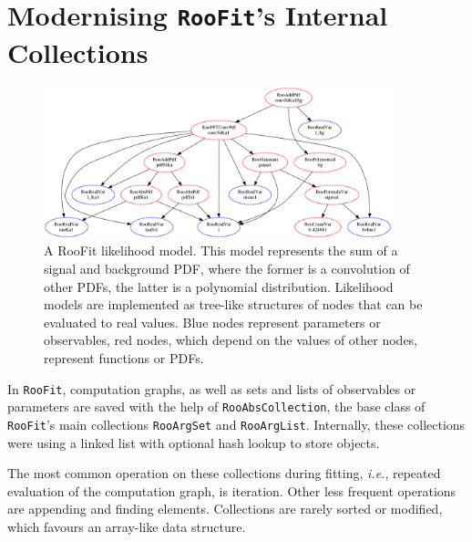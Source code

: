\documentclass[a4paper]{jpconf}
\newcommand{\RooFit}{\texttt{RooFit}\xspace}
\newcommand{\ie}{\textit{i.e.}\xspace}
\begin{document}
\section{Modernising \RooFit's Internal Collections\label{sec:STLCollections}}
\begin{figure}[t]
\centering
\includegraphics[width=0.9\textwidth]{image1.png}
\caption{\label{PDFTree}A RooFit likelihood model\protect\footnotemark. This model represents the sum of a signal and background PDF,
where the former is a convolution of other PDFs, the latter is a polynomial distribution.
Likelihood models are implemented as tree-like structures of nodes that can be evaluated to real values.
Blue nodes represent parameters or observables, red nodes, which depend on the values of other nodes, represent functions or PDFs.
}
\end{figure}
In \RooFit, computation graphs, as well as sets and lists of observables or parameters are saved with the help of \texttt{RooAbsCollection},
the base class of \RooFit's main collections \texttt{RooArgSet} and \texttt{RooArgList}. Internally, these collections were using a
linked list with optional hash lookup to store objects.

The most common operation on these collections during fitting, \ie, repeated evaluation of the computation graph,
is iteration. Other less frequent operations are appending and finding elements. Collections are rarely sorted
or modified, which favours an array-like data structure.
\end{document}
